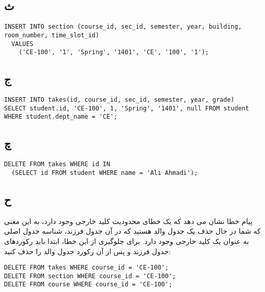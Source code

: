\documentclass[a4paper]{article}
\makeatletter
\newcommand{\emailone}{\texttt{abbas.yazdanmehr1@gmail.com}}
\newcommand{\myinf}{
	\author{
عباس یزدان مهر
\\
99243077\\
 مهندسی کامپیوتر, دانشگاه شهید بهشتی
\\
\emailone
	}
}
\makeatother
\begin{document}
\subsection*{ث}

\begin{latin}
\begin{lstlisting}
INSERT INTO section (course_id, sec_id, semester, year, building, room_number, time_slot_id)
  VALUES 
    ('CE-100', '1', 'Spring', '1401', 'CE', '100', '1');
\end{lstlisting}
\end{latin}


\subsection*{ج}

\begin{latin}
\begin{lstlisting}
INSERT INTO takes(id, course_id, sec_id, semester, year, grade)
SELECT student.id, 'CE-100', 1, 'Spring', '1401', null FROM student WHERE student.dept_name = 'CE';
\end{lstlisting}
\end{latin}

\subsection*{چ}

\begin{latin}
\begin{lstlisting}
DELETE FROM takes WHERE id IN 
  (SELECT id FROM student WHERE name = 'Ali Ahmadi');
\end{lstlisting}
\end{latin}

\subsection*{ح}
پیام خطا نشان می دهد که یک خطای محدودیت کلید خارجی وجود دارد، به این معنی که شما در حال حذف یک جدول والد هستید که در آن جدول فرزند، شناسه جدول اصلی به عنوان یک کلید خارجی وجود دارد. برای جلوگیری از این خطا، ابتدا باید رکوردهای جدول فرزند و پس از آن رکورد جدول والد را حذف کنید:

\begin{latin}
\begin{lstlisting}
DELETE FROM takes WHERE course_id = 'CE-100';
DELETE FROM section WHERE course_id = 'CE-100';
DELETE FROM course WHERE course_id = 'CE-100';
\end{lstlisting}
\end{latin}
\noindent \myinf
\end{document}
